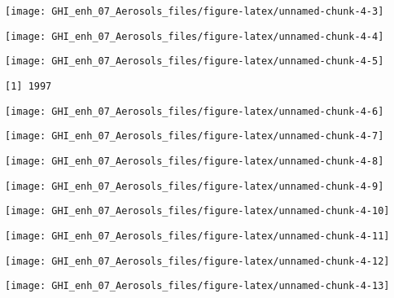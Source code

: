\documentclass[
  10pt,
  a4paper,oneside]{article}
\begin{document}
\begin{center}\texttt{[image: GHI\_enh\_07\_Aerosols\_files/figure-latex/unnamed-chunk-4-3]} \end{center}

\begin{center}\texttt{[image: GHI\_enh\_07\_Aerosols\_files/figure-latex/unnamed-chunk-4-4]} \end{center}

\begin{center}\texttt{[image: GHI\_enh\_07\_Aerosols\_files/figure-latex/unnamed-chunk-4-5]} \end{center}

\begin{verbatim}
[1] 1997
\end{verbatim}

\begin{center}\texttt{[image: GHI\_enh\_07\_Aerosols\_files/figure-latex/unnamed-chunk-4-6]} \end{center}

\begin{center}\texttt{[image: GHI\_enh\_07\_Aerosols\_files/figure-latex/unnamed-chunk-4-7]} \end{center}

\begin{center}\texttt{[image: GHI\_enh\_07\_Aerosols\_files/figure-latex/unnamed-chunk-4-8]} \end{center}

\begin{center}\texttt{[image: GHI\_enh\_07\_Aerosols\_files/figure-latex/unnamed-chunk-4-9]} \end{center}

\begin{center}\texttt{[image: GHI\_enh\_07\_Aerosols\_files/figure-latex/unnamed-chunk-4-10]} \end{center}

\begin{center}\texttt{[image: GHI\_enh\_07\_Aerosols\_files/figure-latex/unnamed-chunk-4-11]} \end{center}

\begin{center}\texttt{[image: GHI\_enh\_07\_Aerosols\_files/figure-latex/unnamed-chunk-4-12]} \end{center}

\begin{center}\texttt{[image: GHI\_enh\_07\_Aerosols\_files/figure-latex/unnamed-chunk-4-13]} \end{center}
\end{document}
